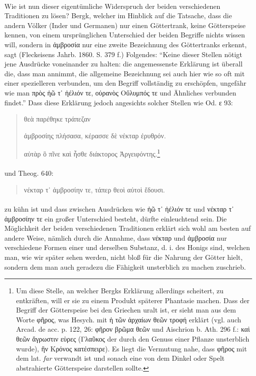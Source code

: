 \documentclass[a4paper, 11pt, oneside]{article}
\begin{document}
\paragraph{}
Wie ist nun dieser eigentümliche Widerspruch der beiden verschiedenen Traditionen zu lösen? Bergk, welcher im Hinblick auf die Tatsache, dass die andern Völker (Inder und Germanen) nur einen Göttertrank, keine Götterspeise kennen, von einem ursprünglichen Unterschied der beiden Begriffe nichts wissen will, sondern in ἀμβροσία nur eine zweite Bezeichnung des Göttertranks erkennt, sagt (Fleckeisens Jahrb. 1860. S. 379 f.) Folgendes: "`Keine dieser Stellen nötigt jene Ausdrücke voneinander zu halten: die angemessenste Erklärung ist überall die, dass man annimmt, die allgemeine Bezeichnung sei auch hier wie so oft mit einer spezielleren verbunden, um den Begriff vollständig zu erschöpfen, ungefähr wie man πρὸς ἠῶ τ᾽ ἠέλιόν τε, οὐρανὸς Οὔλυμπός τε und Ähnliches verbunden findet."' Dass diese Erklärung jedoch angesichts solcher Stellen wie Od. ε 93:
\begin{quotation}\large
\hspace*{15mm}θεὰ παρέθηκε τράπεζαν

ἀμβροσίης πλήσασα, κέρασσε δὲ νέκταρ ἐρυθρόν.

αὐτὰρ ὃ πῖνε καὶ ἦσθε διάκτορος Ἀργειφόντης.\footnote{Um diese Stelle, an welcher Bergks Erklärung allerdings scheitert, zu entkräften, will er sie zu einem Produkt späterer Phantasie machen. Dass der Begriff der Götterspeise bei den Griechen uralt ist, er sieht man aus dem Worte φῆρος, was Hesych. mit ἡ τῶν ἀρχαίων θεῶν τροφή erklärt (vgl. auch Arcad. de acc. p. 122, 26: φῆρον βρῶμα θεῶν und Aischrion b. Ath. 296 f.: καὶ θεῶν ἄγρωστιν εὑρες (Γλαῦκος der durch den Genuss einer Pflanze unsterblich wurde), ἣν Κρόνος κατέσπειρε). Es liegt die Vermutung nahe, dass φῆρος mit dem lat. \emph{far} verwandt ist und sonach eine von dem Dinkel oder Spelt abstrahierte Götterspeise darstellen sollte.}
\end{quotation}
\paragraph{}
und Theog. 640:
\begin{quotation}\large
νέκταρ τ᾽ ἀμβροσίην τε, τάπερ θεοὶ αὐτοὶ ἔδουσι.
\end{quotation}
\paragraph{}
zu kühn ist und dass zwischen Ausdrücken wie ἠῶ τ᾽ ἠέλιόν τε und νέκταρ τ᾽ ἀμβροσίην τε ein großer Unterschied besteht, dürfte einleuchtend sein. Die Möglichkeit der beiden verschiedenen Traditionen erklärt sich wohl am besten auf andere Weise, nämlich durch die Annahme, dass νέκταρ und ἀμβροσία nur verschiedene Formen einer und derselben Substanz, d. i. des Honigs sind, welchen man, wie wir später sehen werden, nicht bloß für die Nahrung der Götter hielt, sondern dem man auch geradezu die Fähigkeit unsterblich zu machen zuschrieb.
\end{document}
